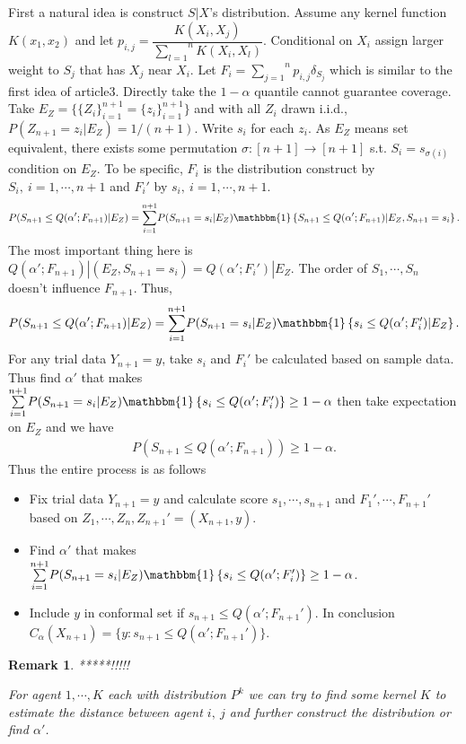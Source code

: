 \documentclass[12pt, a4paper, oneside]{article}
\newtheorem{remark}[theorem]{Remark}
\begin{document}
    
    First a natural idea is construct $S|X$'s distribution. Assume any kernel function $K(x_1,x_2)$ and let $p_{i,j}=\dfrac{K(X_i,X_j)}{\overset{n}{\underset{l=1}\sum}K(X_i,X_l)}$. Conditional on $X_i$ assign larger weight to $S_j$ that has $X_j$ near $X_i$. Let $F_i=\overset{n}{\underset{j=1}\sum}p_{i,j}\delta_{S_j}$ which is similar to the first idea of article3. Directly take the $1-\alpha$ quantile cannot guarantee coverage. Take $E_Z=\{\{Z_i\}_{i=1}^{n+1}=\{z_i\}_{i=1}^{n+1}\}$ and with all $Z_i$ drawn i.i.d., $P(Z_{n+1}=z_i|E_Z)=1/(n+1)$. Write $s_{i}$ for each $z_i$. As $E_Z$ means set equivalent, there exists some permutation $\sigma:[n+1]\rightarrow[n+1]$ s.t. $S_i=s_{\sigma(i)}$ condition on $E_Z$. To be specific, $F_i$ is the distribution construct by $S_i,\ i=1,\cdots,n+1$ and $F_i'$ by $s_i,\ i=1,\cdots,n+1$.
    \begin{align*}
        P(S_{n+1}\leq Q(\alpha';F_{n+1})|E_Z)=\overset{n+1}{\underset{i=1}\sum}P(S_{n+1}=s_i|E_Z)\mathbbm{1}\left\{ S_{n+1}\leq Q(\alpha';F_{n+1})|E_Z,S_{n+1}=s_i \right\}.
    \end{align*}
    The most important thing here is $Q(\alpha';F_{n+1})|(E_Z,S_{n+1}=s_i)=Q(\alpha';F_i')|E_Z$. The order of $S_1,\cdots,S_n$ doesn't influence $F_{n+1}$. Thus,
    \begin{align*}
        P(S_{n+1}\leq Q(\alpha';F_{n+1})|E_Z)=\overset{n+1}{\underset{i=1}\sum}P(S_{n+1}=s_i|E_Z)\mathbbm{1}\left\{ s_i\leq Q(\alpha';F_i')|E_Z \right\}.
    \end{align*}
    For any trial data $Y_{n+1}=y$, take $s_i$ and $F_i'$ be calculated based on sample data. Thus find $\alpha'$ that makes $\overset{n+1}{\underset{i=1}\sum}P(S_{n+1}=s_i|E_Z)\mathbbm{1}\left\{ s_i\leq Q(\alpha';F_i') \right\}\geq 1-\alpha$ then take expectation on $E_Z$ and we have
    \begin{align*}
        P(S_{n+1}\leq Q(\alpha';F_{n+1}))\geq 1-\alpha.
    \end{align*}
    Thus the entire process is as follows
    \begin{itemize}
        \item Fix trial data $Y_{n+1}=y$ and calculate score $s_1,\cdots,s_{n+1}$ and $F_1',\cdots,F_{n+1}'$ based on $Z_1,\cdots,Z_n,Z_{n+1}'=(X_{n+1},y)$.
        \item Find $\alpha'$ that makes $\overset{n+1}{\underset{i=1}\sum}P(S_{n+1}=s_i|E_Z)\mathbbm{1}\left\{ s_i\leq Q(\alpha';F_i') \right\}\geq 1-\alpha$.
        \item Include $y$ in conformal set if $s_{n+1}\leq Q(\alpha';F_{n+1}')$. In conclusion $C_\alpha(X_{n+1})=\{y:s_{n+1}\leq Q(\alpha';F_{n+1}')\}$.
    \end{itemize}
    \begin{remark}
        *****!!!!!


        For agent $1,\cdots,K$ each with distribution $P^k$ we can try to find some kernel $K$ to estimate the distance between agent $i,\ j$ and further construct the distribution or find $\alpha'$.
    \end{remark}
\end{document}
